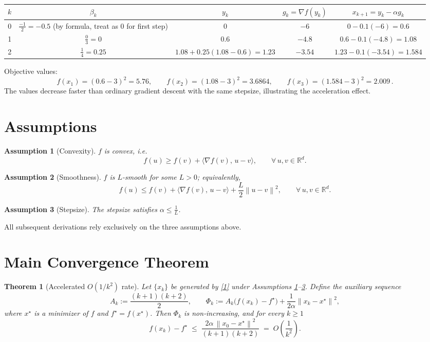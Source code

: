 \documentclass{article}
\newtheorem{theorem}{Theorem}
\newtheorem{assumption}{Assumption}
\newcommand{\grad}{\nabla}
\newcommand{\norm}[1]{\left\|#1\right\|}
\begin{document}
\begin{center}
\begin{tabular}{c|c|c|c|c}
\(k\) & \(\beta_k\) & \(y_k\) & \(g_k=\grad f(y_k)\) & \(x_{k+1}=y_k-\alpha g_k\)\\ \hline
0 & \(\frac{-1}{2}= -0.5\) (by formula, treat as \(0\) for first step) & \(0\) & \(-6\) & \(0-0.1(-6)=0.6\)\\[4pt]
1 & \(\frac{0}{3}=0\) & \(0.6\) & \(-4.8\) & \(0.6-0.1(-4.8)=1.08\)\\[4pt]
2 & \(\frac{1}{4}=0.25\) & \(1.08+0.25(1.08-0.6)=1.23\) & \(-3.54\) & \(1.23-0.1(-3.54)=1.584\)
\end{tabular}
\end{center}

Objective values:
\[
f(x_1)= (0.6-3)^2=5.76,\qquad
f(x_2)= (1.08-3)^2=3.6864,\qquad
f(x_3)= (1.584-3)^2=2.009\,.
\]
The values decrease faster than ordinary gradient descent with the same
stepsize, illustrating the acceleration effect.

\newpage
\section*{Assumptions}
\begin{assumption}[Convexity]\label{ass:conv}
\(f\) is convex, i.e.
\[
f(u)\ge f(v)+\langle \grad f(v),\,u-v\rangle,\qquad\forall\,u,v\in\mathbb{R}^d.
\]
\end{assumption}
\begin{assumption}[Smoothness]\label{ass:smooth}
\(f\) is \(L\)-smooth for some \(L>0\); equivalently,
\[
f(u)\le f(v)+\langle \grad f(v),\,u-v\rangle+\frac{L}{2}\norm{u-v}^2,
\qquad\forall\,u,v\in\mathbb{R}^d.
\]
\end{assumption}
\begin{assumption}[Stepsize]\label{ass:stepsize}
The stepsize satisfies \(\alpha\le \frac{1}{L}\).
\end{assumption}
All subsequent derivations rely exclusively on the three assumptions above.

\section*{Main Convergence Theorem}
\begin{theorem}[Accelerated \(O(1/k^2)\) rate]\label{thm:rate}
Let \(\{x_k\}\) be generated by \eqref{1} under Assumptions
\ref{ass:conv}–\ref{ass:stepsize}.  Define the auxiliary sequence
\[
A_k:=\frac{(k+1)(k+2)}{2},\qquad
\Phi_k:=A_k\bigl(f(x_k)-f^\star\bigr)+\frac{1}{2\alpha}\norm{x_k-x^\star}^2,
\]
where \(x^\star\) is a minimizer of \(f\) and \(f^\star=f(x^\star)\).
Then \(\Phi_k\) is non‑increasing, and for every \(k\ge 1\)
\[
f(x_k)-f^\star \;\le\; \frac{2\alpha\,\norm{x_0-x^\star}^2}{(k+1)(k+2)}
\;=\; O\!\left(\frac{1}{k^{2}}\right).
\]
\end{theorem}
\end{document}

